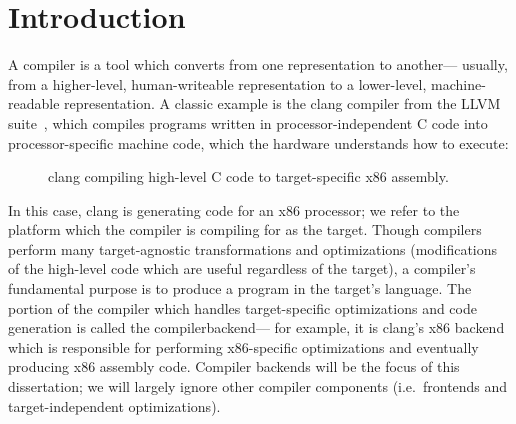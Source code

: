 \chapter{Introduction}

A \gls{compiler}
  is a tool which
  converts from one representation
  to another---%
  usually, from a
  higher-level,
  human-writeable
  representation
  to a lower-level,
  machine-readable representation.
A classic example
  is the clang compiler
  from the LLVM suite~\cite{lattner2004llvm},
  which
  compiles programs written in 
  processor-independent C code
  into processor-specific
  machine code,
  which the hardware understands how
  to execute:
\begin{figure}[!h]
\centering
{}
\caption{clang compiling high-level C code to target-specific x86 assembly.}
\label{fig:clang-c-to-x86}
\end{figure}

\noindent
In this case,
  clang is generating code 
  for an x86 processor;
  we refer to 
  the platform
  which the compiler is compiling for
  as the \gls{target}.
Though compilers perform many target-agnostic
  transformations and optimizations
  (modifications of the high-level code
    which are useful regardless of the target),
  a compiler's fundamental purpose
  is to produce a program
  in the target's language.
The portion of the compiler
  which handles target-specific optimizations
  and code generation is called the
  \gls{compilerbackend}---%
  for example,
  it is clang's x86 backend which is responsible for
  performing x86-specific optimizations
  and eventually producing
  x86 assembly code.
Compiler backends will be the focus
  of this dissertation;
  we will largely ignore other compiler components
  (i.e.~frontends and target-independent optimizations).


